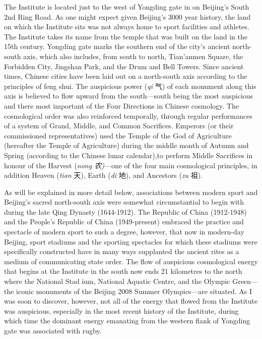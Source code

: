 The Institute is located just to the west of Yongding gate in on Beijing's South 2nd Ring Road. As one might expect given Beijing's 3000 year history, the land on which the Institute sits was not always home to sport facilities and athletes. The Institute takes its name from the temple that was built on the land in the 15th century.  Yongding gate marks the southern end of the city's ancient north-south axis, which also includes, from south to north, Tian'anmen Square, the Forbidden City, Jingshan Park, and the Drum and Bell Towers.  Since ancient times, Chinese cities have been laid out on a north-south axis according to the principles of feng shui. The auspicious power (\textit{qi} 气) of each monument along this axis is believed to flow upward from the south---south being the most auspicious and there most important of the Four Directions in Chinese cosmology.  The cosmological order was also reinforced temporally, through regular performances of a system of Grand, Middle, and Common Sacrifices.  Emperors (or their commissioned representatives) used the Temple of the God of Agriculture (hereafter the Temple of Agriculture) during the middle month of Autumn and Spring (according to the Chinese lunar calendar),to perform Middle Sacrifices in honour of the Harvest (\textit{nong 农)}---one of the four main cosmological principles, in addition Heaven (\textit{tian} 天), Earth (\textit{di} 地), and Ancestors (\textit{zu} 祖)\citep[98]{Brownell2008}.

As will be explained in more detail below, associations between modern sport and Beijing's sacred north-south axis were somewhat circumstantial to begin with during the late Qing Dynasty (1644-1912). The Republic of China (1912-1948) and the People's Republic of China (1949-present) embraced the practice and spectacle of modern sport to such a degree, however, that now in modern-day Beijing, sport stadiums and the sporting spectacles for which these stadiums were specifically constructed have in many ways supplanted the ancient rites as a medium of communicating state order.  The flow of auspicious cosmological energy that begins at the Institute in the south now ends 21 kilometres to the north where the National Stad
ium, National Aquatic Centre, and the Olympic Green---the iconic monuments of the Beijing 2008 Summer Olympics---are situated.  As I was soon to discover, however, not all of the energy that flowed from the Institute was auspicious, especially in the most recent history of the Institute, during which time the dominant energy emanating from the western flank of Yongding gate was associated with rugby.



